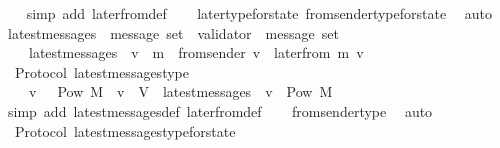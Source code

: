 \begin{isabellebody}
%
\isadelimproof
\ \ %
\endisadelimproof
%
\isatagproof
{}\isamarkupfalse%
\ {\isacharparenleft}simp\ add{\isacharcolon}\ later{\isacharunderscore}from{\isacharunderscore}def{\isacharparenright}\isanewline
\ \ \isamarkupfalse%
\ later{\isacharunderscore}type{\isacharunderscore}for{\isacharunderscore}state\ from{\isacharunderscore}sender{\isacharunderscore}type{\isacharunderscore}for{\isacharunderscore}state\ \isamarkupfalse%
\ auto%
\endisatagproof
{\isafoldproof}%
%
\isadelimproof
\isanewline
%
\endisadelimproof
\isanewline
\isanewline
{}\isamarkupfalse%
\ latest{\isacharunderscore}messages\ {\isacharcolon}{\isacharcolon}\ {\isachardoublequoteopen}message\ set\ {\isasymRightarrow}\ {\isacharparenleft}validator\ {\isasymRightarrow}\ message\ set{\isacharparenright}{\isachardoublequoteclose}\isanewline
\ \ \isanewline
\ \ \ \ {\isachardoublequoteopen}latest{\isacharunderscore}messages\ {\isasymsigma}\ v\ {\isacharequal}\ {\isacharbraceleft}m\ {\isasymin}\ from{\isacharunderscore}sender\ {\isacharparenleft}v{\isacharcomma}\ {\isasymsigma}{\isacharparenright}{\isachardot}\ later{\isacharunderscore}from\ {\isacharparenleft}m{\isacharcomma}\ v{\isacharcomma}\ {\isasymsigma}{\isacharparenright}\ {\isacharequal}\ {\isasymemptyset}{\isacharbraceright}{\isachardoublequoteclose}\isanewline
\isanewline
{}\isamarkupfalse%
\ {\isacharparenleft}\ Protocol{\isacharparenright}\ latest{\isacharunderscore}messages{\isacharunderscore}type\ {\isacharcolon}\isanewline
\ \ {\isachardoublequoteopen}{\isasymforall}\ {\isasymsigma}\ v{\isachardot}\ {\isasymsigma}\ {\isasymin}\ Pow\ M\ {\isasymand}\ v\ {\isasymin}\ V\ {\isasymlongrightarrow}\ latest{\isacharunderscore}messages\ {\isasymsigma}\ v\ {\isasymin}\ Pow\ M{\isachardoublequoteclose}\isanewline
%
\isadelimproof
\ \ %
\endisadelimproof
%
\isatagproof
{}\isamarkupfalse%
\ {\isacharparenleft}simp\ add{\isacharcolon}\ latest{\isacharunderscore}messages{\isacharunderscore}def\ later{\isacharunderscore}from{\isacharunderscore}def{\isacharparenright}\isanewline
\ \ \isamarkupfalse%
\ from{\isacharunderscore}sender{\isacharunderscore}type\ \isamarkupfalse%
\ auto%
\endisatagproof
{\isafoldproof}%
%
\isadelimproof
\isanewline
%
\endisadelimproof
\isanewline
{}\isamarkupfalse%
\ {\isacharparenleft}\ Protocol{\isacharparenright}\ latest{\isacharunderscore}messages{\isacharunderscore}type{\isacharunderscore}for{\isacharunderscore}state\ {\isacharcolon}\isanewline

\end{isabellebody}
